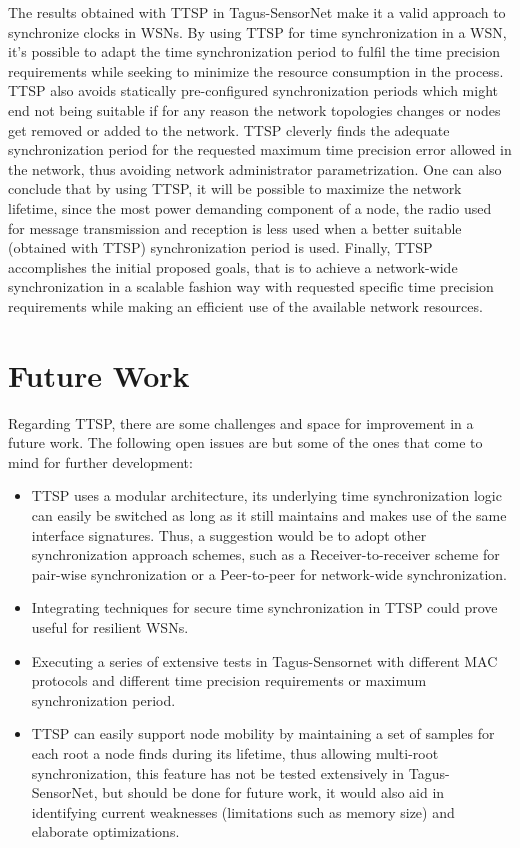 The results obtained with TTSP in Tagus-SensorNet make it a valid approach to synchronize clocks in WSNs. By using TTSP for time synchronization in a WSN, it's possible to adapt the time synchronization period to fulfil the time precision requirements while seeking to minimize the resource consumption in the process. TTSP also avoids statically pre-configured synchronization periods which might end not being suitable if for any reason the network topologies changes or nodes get removed or added to the network. TTSP cleverly finds the adequate synchronization period for the requested maximum time precision error allowed in the network, thus avoiding network administrator parametrization. One can also conclude that by using TTSP, it will be possible to maximize the network lifetime, since the most power demanding component of a node, the radio used for message transmission and reception is less used when a better suitable (obtained with TTSP) synchronization period is used. Finally, TTSP accomplishes the initial proposed goals, that is to achieve a network-wide synchronization in a scalable fashion way with requested specific time precision requirements while making an efficient use of the available network resources.

\section{Future Work}

Regarding TTSP, there are some challenges and space for improvement in a future work. The following open issues are but some of the ones that come to mind for further development:
\begin{itemize}
\item TTSP uses a modular architecture, its underlying time synchronization logic can easily be switched as long as it still maintains and makes use of the same interface signatures. Thus, a suggestion would be to adopt other synchronization approach schemes, such as a Receiver-to-receiver scheme for pair-wise synchronization or a Peer-to-peer for network-wide synchronization.
\item Integrating techniques for secure time synchronization in TTSP could prove useful for resilient WSNs.
\item Executing a series of extensive tests in Tagus-Sensornet with different MAC protocols and different time precision requirements or maximum synchronization period.
\item TTSP can easily support node mobility by maintaining a set of samples for each root a node finds during its lifetime, thus allowing multi-root synchronization, this feature has not be tested extensively in Tagus-SensorNet, but should be done for future work, it would also aid in identifying current weaknesses (limitations such as memory size) and elaborate optimizations.
\end{itemize}